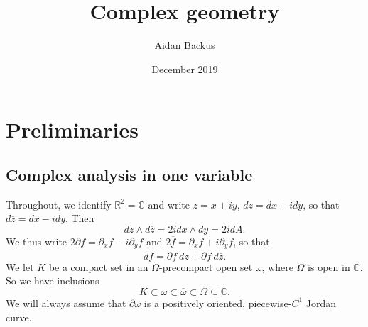 \documentclass[12pt]{report}
\title{Complex geometry}
\author{Aidan Backus}
\date{December 2019}
\newcommand{\RR}{\mathbb{R}}
\newcommand{\CC}{\mathbb{C}}
\theoremstyle{definition}
\begin{document}
\maketitle

\tableofcontents

\chapter{Preliminaries}

\section{Complex analysis in one variable}
Throughout, we identify $\RR^2 = \CC$ and write $z = x + iy$, $dz = dx + idy$, so that $d\overline z = dx - i dy$. Then
$$dz \wedge d\overline z = 2i dx \wedge dy = 2i dA.$$
We thus write $2 \partial f = \partial_x f - i\partial_y f$ and $2\overline f = \partial_x f + i\partial_y f$, so that
$$df = \partial f ~dz + \overline \partial f ~d\overline z.$$
We let $K$ be a compact set in an $\Omega$-precompact open set $\omega$, where $\Omega$ is open in $\CC$. So we have inclusions
$$K \subset \omega \subset \overline \omega \subset \Omega \subseteq \CC.$$
We will always assume that $\partial \omega$ is a positively oriented, piecewise-$C^1$ Jordan curve.
\end{document}
